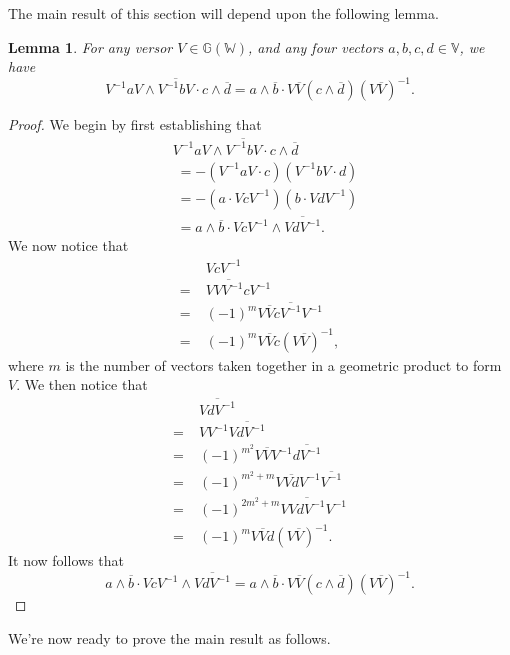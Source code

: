 \documentclass{birkjour}
\newtheorem{lem}[thm]{Lemma}
\theoremstyle{definition}
\theoremstyle{remark}
\numberwithin{equation}{section}
\newcommand{\G}{\mathbb{G}}
\newcommand{\V}{\mathbb{V}}
\newcommand{\W}{\mathbb{W}}
\begin{document}
The main result of this section will depend upon the following lemma.
\begin{lem}\label{lma_versor_transfer}
For any versor $V\in\G(\W)$, and any four vectors $a,b,c,d\in\V$, we have
\begin{equation}
V^{-1}aV\wedge\overline{V^{-1}bV}\cdot c\wedge\overline{d} =
a\wedge\overline{b}\cdot V\overline{V}(c\wedge\overline{d})(V\overline{V})^{-1}.
\end{equation}
\end{lem}
\begin{proof}
We begin by first establishing that
\begin{align}
 & V^{-1}aV\wedge\overline{V^{-1}bV}\cdot c\wedge\overline{d} \\
&\;= -(V^{-1}aV\cdot c)(V^{-1}bV\cdot d) \\
&\;= -(a\cdot VcV^{-1})(b\cdot VdV^{-1}) \\
&\;= a\wedge\overline{b}\cdot VcV^{-1}\wedge\overline{VdV^{-1}}.
\end{align}
We now notice that
\begin{align}
& VcV^{-1} \\
=\;& V\overline{VV^{-1}}cV^{-1} \\
=\;& (-1)^m V\overline{V}c\overline{V^{-1}}V^{-1} \\
=\;& (-1)^m V\overline{V}c(V\overline{V})^{-1},
\end{align}
where $m$ is the number of vectors taken together in a geometric
product to form $V$.  We then notice that
\begin{align}
& \overline{VdV^{-1}} \\
=\;& VV^{-1}\overline{VdV^{-1}} \\
=\;& (-1)^{m^2}V\overline{V}V^{-1}\overline{dV^{-1}} \\
=\;&(-1)^{m^2+m}V\overline{Vd}V^{-1}\overline{V^{-1}} \\
=\;&(-1)^{2m^2+m}V\overline{VdV^{-1}}V^{-1} \\
=\;&(-1)^mV\overline{V}d(V\overline{V})^{-1}.
\end{align}
It now follows that
\begin{equation}
a\wedge\overline{b}\cdot VcV^{-1}\wedge\overline{VdV^{-1}} =
a\wedge\overline{b}\cdot V\overline{V}(c\wedge\overline{d})(V\overline{V})^{-1}.
\end{equation}
\end{proof}
We're now ready to prove the main result as follows.
\end{document}
